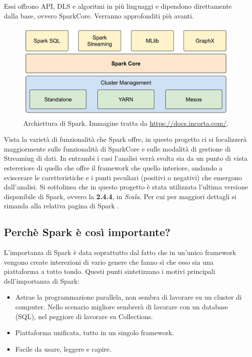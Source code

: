 \documentclass[12pt,italian]{article}
\begin{document}
Essi offrono API, DLS e algoritmi in più linguaggi e dipendono direttamente dalla base, ovvero SparkCore. Verranno approfonditi più avanti.
\begin{figure}[H]
	\centering 
	\includegraphics[width=0.8\linewidth]{img/sparkModules.png}
	\caption{Archiettura di Spark. Immagine tratta da \url{https://docs.incorta.com/}.}
	\label{fig:SparkModules}
\end{figure}
\par Vista la varietà di funzionalità che Spark offre, in questo progetto ci si focalizzerà maggiormente sulle funzionalità di SparkCore e sulle modalità di gestione di Streaming di dati. In entrambi i casi l'analisi verrà svolta sia da un punto di vista estereriore di quello che offre il framework che quello interiore, andando a sviscerare le caretteristiche e i punti peculiari (positivi o negativi) che emergono dall'analisi. 
\newline
Si sottolinea che in questo progetto è stata utilizzata l'ultima versione disponibile di Spark, ovvero la \textbf{2.4.4}, in \textit{Scala}. Per cui per maggiori dettagli si rimanda alla relativa pagina di Spark \cite{spark}.
\subsection{Perchè Spark è così importante?}
L'importanza di Spark è data soprattutto dal fatto che in un'unico framework vengono create interezioni di vario genere che fanno sì che esso sia una piattaforma a tutto tondo. Questi punti sintetizzano i motivi principali dell'importanza di Spark:
\begin{itemize}
	\item Astrae la programmazione parallela, non sembra di lavorare su un cluster di computer.
	Nello scenario migliore sembrerà di lavorare con un database (SQL), nel peggiore di lavorare su Collections.
	\item Piattaforma unificata, tutto in un singolo framework.
	\item Facile da usare, leggere e capire.
\end{itemize}
\end{document}
